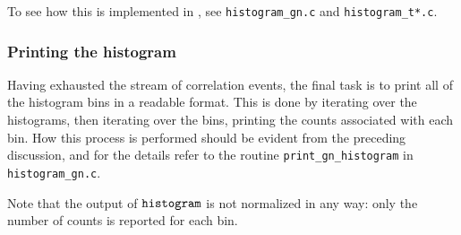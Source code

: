 To see how this is implemented in , see \texttt{histogram\_gn.c} and \texttt{histogram\_t*.c}. 

\subsubsection{Printing the histogram}
Having exhausted the stream of correlation events, the final task is to print all of the histogram bins in a readable format. This is done by iterating over the histograms, then iterating over the bins, printing the counts associated with each bin. How this process is performed should be evident from the preceding discussion, and for the details refer to the routine \texttt{print\_gn\_histogram} in \texttt{histogram\_gn.c}.

Note that the output of $\texttt{histogram}$ is not normalized in any way: only the number of counts is reported for each bin.

